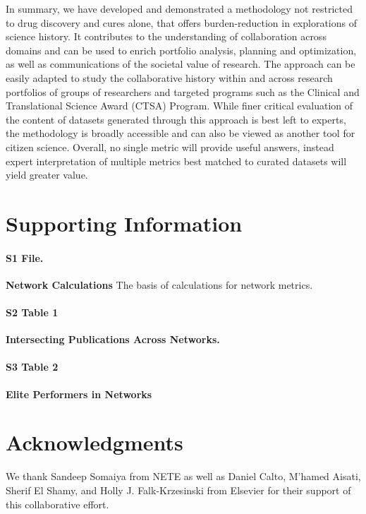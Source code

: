 \documentclass[10pt,letterpaper]{article}
\begin{document}
In summary, we have developed and demonstrated a methodology not restricted to  drug discovery and cures alone, that offers burden-reduction in explorations of science history. It contributes to the understanding of collaboration across domains and can be used to  enrich portfolio analysis, planning and optimization, as well as communications of the societal value of research. The approach can be easily adapted to study the collaborative history within and across research portfolios of groups of researchers and targeted programs such as the Clinical and Translational Science Award (CTSA) Program. While finer critical evaluation of the content of datasets generated through this approach is best left to experts, the methodology is broadly accessible and can also be viewed as another tool for citizen science. Overall, no single metric will provide useful answers, instead expert interpretation of multiple metrics best matched to curated datasets will yield greater value.

\section*{Supporting Information}

\paragraph*{S1 File.}
\label{S1_File}
{\bf Network Calculations} The basis of calculations for network metrics.

\paragraph*{S2 Table 1}
\label{S2_Table 1}
{\bf Intersecting Publications Across Networks.} 

\paragraph*{S3 Table 2}
\label{S3_Table 2}
{\bf Elite Performers in Networks} 

\section*{Acknowledgments} We thank Sandeep Somaiya from NETE as well as Daniel Calto, M'hamed Aisati, Sherif El Shamy, and Holly J. Falk-Krzesinski from Elsevier for their support of this collaborative effort.

\nolinenumbers
 
\end{document}
